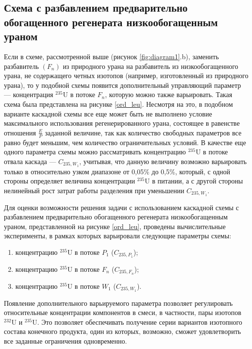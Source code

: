 \subsection{Схема с разбавлением предварительно обогащенного регенерата низкообогащенным ураном}\label{ch2_1_1}

Если в схеме, рассмотренной выше (рисунок \ref{fig:diagram1}.b), заменить разбавитель $(F_n)$ из природного урана на разбавитель из низкообогащенного урана, не содержащего четных изотопов (например, изготовленный из природного урана), то у подобной схемы появится дополнительный управляющий параметр --- концентрация $^{235}$U в потоке $F_n$, которую можно также варьировать. Такая схема была представлена на рисунке \ref{ord_leu}. Несмотря на это, в подобном варианте каскадной схемы все еще может быть не выполнено условие максимального использования регенерированного урана, состоящее в равенстве отношения $\frac{E}{P}$ заданной величине, так как количество свободных параметров все равно будет меньшим, чем количество ограничительных условий. В качестве еще одного параметра схемы можно рассматривать концентрацию $^{235}$U в потоке отвала каскада --- $C_{235, W_1}$, учитывая, что данную величину возможно варьировать только в относительно узком диапазоне от 0,05\% до 0,5\%, который, с одной стороны определяет величина концентрации $^{235}$U в питании, а с другой стороны нелинейный рост затрат работы разделения при уменьшении $C_{235, W_1}$. 

Для оценки возможности решения задачи с использованием каскадной схемы с разбавлением предварительно обогащенного регенерата низкообогащенным ураном, представленной на рисунке \ref{ord_leu}, проведены вычислительные эксперименты, в рамках которых варьировали следующие параметры схемы:

\begin{enumerate}
  \item концентрацию $^{235}$U в потоке $P_1$ ($C_{235, P_1}$);
  \item концентрацию $^{235}$U в потоке $F_n$ ($C_{235, F_n}$);
  \item концентрацию $^{235}$U в потоке $W_1$ ($C_{235, W_1}$).
\end{enumerate}

Появление дополнительного варьируемого параметра позволяет регулировать относительные концентрации компонентов в смеси, в частности, пары изотопов $^{232}$U и $^{235}$U. Это позволяет обеспечивать получение серии вариантов изотопного состава конечного продукта, один из которых, возможно, сможет удовлетворить все заданные ограничения одновременно. 

